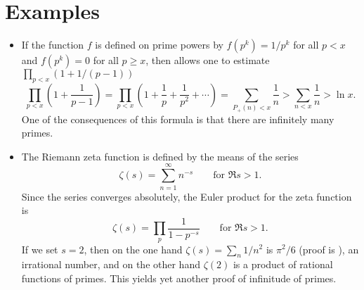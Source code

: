 \documentclass[12pt]{article}
\begin{document}
\section*{Examples}
\begin{itemize}
\item If the function $f$ is defined on prime powers by
$f(p^k)=1/p^k$ for all $p<x$ and $f(p^k)=0$ for all $p\geq x$,
then  allows one to estimate $\prod_{p<x}
(1+1/(p-1))$
\begin{equation*}
\prod_{p<x} \left(1+\frac{1}{p-1}\right) =\prod_{p<x}
\left(1+\frac{1}{p}+\frac{1}{p^2}+\dotsb\right)=\sum_{P_+(n)<x}
\frac{1}{n}>\sum_{n<x}\frac{1}{n}>\ln x.
\end{equation*}
One of the consequences of this formula is that there are
infinitely many primes.

\item The Riemann zeta function is defined by the means of the
series
\begin{equation*}
\zeta(s)=\sum_{n=1}^\infty n^{-s}\qquad\text{for $\Re s>1$}.
\end{equation*}
Since the series converges absolutely, the Euler product for the zeta function is
\begin{equation*}
\zeta(s)=\prod_{p}\frac{1}{1-p^{-s}}\qquad\text{for $\Re s>1$}.
\end{equation*}
If we set $s=2$, then on the one hand $\zeta(s)=\sum_n 1/n^2$ is
$\pi^2/6$ (proof is
), an
irrational number, and on the other hand $\zeta(2)$ is a product of rational functions of primes. This yields yet another proof of infinitude of
primes.
\end{itemize}
\end{document}
